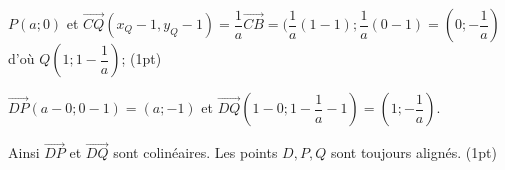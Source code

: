 \documentclass[a4paper,11pt]{article}
\theoremstyle{break}
\begin{document}
\begin{exo}
\begin{enumerate}
\begin{correction}

$P(a;0)$ et $\vec{CQ}(x_Q-1,y_Q-1)=\dfrac{1}{a}\vec{CB}=(\dfrac{1}{a}(1-1);\dfrac{1}{a}(0-1)=(0;-\dfrac{1}{a})$ d'o\`u 
$Q(1;1-\dfrac{1}{a})$; (1pt)

$\vec{DP}(a-0;0-1)=(a;-1)$ et $\vec{DQ}(1-0;1-\dfrac{1}{a}-1)=(1;-\dfrac{1}{a})$.

Ainsi $\vec{DP}$ et $\vec{DQ}$ sont colin\'eaires. Les points $D,P,Q$ sont toujours align\'es. (1pt)
\end{correction}

\end{enumerate}

% 

  \end{exo}
  
  


    
\end{document}

